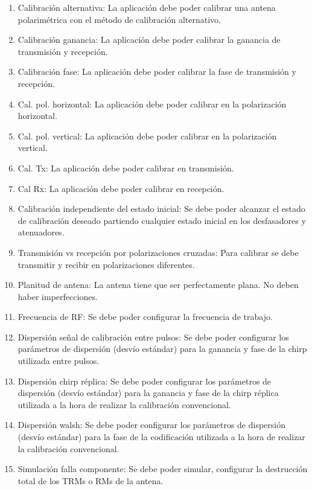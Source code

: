 \begin{enumerate}
    \item Calibración alternativa: La aplicación debe poder calibrar una antena polarimétrica con el método de calibración alternativo.

    \item Calibración ganancia: La aplicación debe poder calibrar la ganancia de transmisión y recepción.

    \item Calibración fase: La aplicación debe poder calibrar la fase de transmisión y recepción.

    \item Cal. pol. horizontal: La aplicación debe poder calibrar en la polarización horizontal.
    \item Cal. pol. vertical: La aplicación debe poder calibrar en la polarización vertical.
    \item Cal. Tx: La aplicación debe poder calibrar en transmisión.
    \item Cal Rx: La aplicación debe poder calibrar en recepción.

    \item Calibración independiente del estado inicial: Se debe poder alcanzar el estado de calibración deseado partiendo
		cualquier estado inicial en los desfasadores y atenuadores.

    \item Transmisión vs recepción por polarizaciones cruzadas: Para calibrar se debe transmitir y recibir en polarizaciones
		diferentes.

    \item Planitud de antena: La antena tiene que ser perfectamente plana. No deben haber imperfecciones.

    \item Frecuencia de RF: Se debe poder configurar la frecuencia de trabajo.

    \item Dispersión señal de calibración entre pulsos: Se debe poder configurar los parámetros de dispersión (desvío estándar) para
		la ganancia y fase de la chirp utilizada entre pulsos.

    \item Dispersión chirp réplica: Se debe poder configurar los parámetros de dispersión (desvío estándar) para la
		ganancia y fase de la chirp réplica utilizada a la hora de realizar la calibración convencional.

    \item Dispersión walsh: Se debe poder configurar los parámetros de dispersión (desvío estándar) para la fase de la
		codificación utilizada a la hora de realizar la calibración convencional.

    \item Simulación falla componente: Se debe poder simular, configurar la destrucción total de los TRMs o RMs de la antena.
\end{enumerate}


